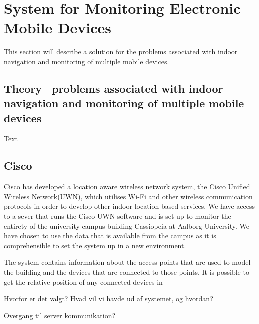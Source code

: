 \section{System for Monitoring Electronic Mobile Devices}\label{sec:monitoring}
This section will describe a solution for the problems associated with indoor navigation and monitoring of multiple mobile devices.    

\subsection{Theory ~problems associated with indoor navigation and monitoring of multiple mobile devices~}
Text

\subsection{Cisco}\label{subsec:cisco}
Cisco has developed a location aware wireless network system, the Cisco Unified Wireless Network(UWN), which utilises Wi-Fi and other wireless communication protocols in order to develop other indoor location based services\cite{uwn}. We have access to a sever that runs the Cisco UWN software and is set up to monitor the entirety of the university campus building Cassiopeia at Aalborg University. We have chosen to use the data that is available from the campus as it is comprehensible to set the system up in a new environment. 

The system contains information about the access points that are used to model the building and the devices that are connected to those points. It is possible to get the relative position of any connected devices in 

Hvorfor er det valgt?
Hvad vil vi havde ud af systemet, og hvordan?

Overgang til server kommunikation?